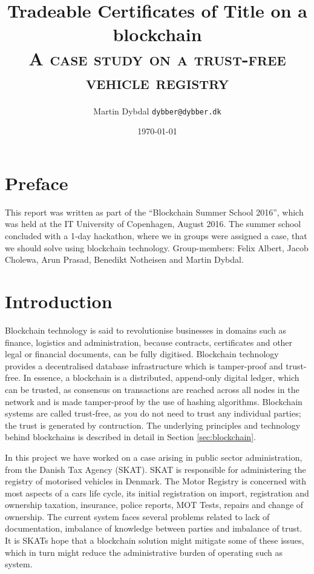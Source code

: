 \documentclass[oneside,a4paper,10pts,article]{memoir}
\title{Tradeable Certificates of Title on a blockchain \\
 {\normalfont\normalsize\scshape A case study on a trust-free vehicle registry}
}
\author{Martin Dybdal \texttt{dybber@dybber.dk}}
\date{\today}
\begin{document}
\maketitle

\begin{abstract}
  
\end{abstract}

\chapter{Preface}
This report was written as part of the ``Blockchain Summer School
2016'', which was held at the IT University of Copenhagen, August
2016. The summer school concluded with a 1-day hackathon, where we in
groups were assigned a case, that we should solve using blockchain
technology. Group-members: Felix Albert, Jacob Cholewa, Arun Prasad,
Benedikt Notheisen and Martin Dybdal.

\chapter{Introduction}
Blockchain technology is said to revolutionise businesses in domains
such as finance, logistics and administration, because contracts,
certificates and other legal or financial documents, can be fully
digitised. Blockchain technology provides a decentralised database
infrastructure which is tamper-proof and trust-free. In essence, a
blockchain is a distributed, append-only digital ledger, which can be
trusted, as consensus on transactions are reached across all nodes in
the network and is made tamper-proof by the use of hashing
algorithms. Blockchain systems are called trust-free, as you do not
need to trust any individual parties; the trust is generated by
contruction. The underlying principles and technology behind
blockchains is described in detail in Section \ref{sec:blockchain}.

In this project we have worked on a case arising in public sector
administration, from the Danish Tax Agency (SKAT). SKAT is responsible
for administering the registry of motorised vehicles in Denmark. The
Motor Registry is concerned with most aspects of a cars life cycle,
its initial registration on import, registration and ownership
taxation, insurance, police reports, MOT Tests, repairs and change of
ownership. The current system faces several problems related to lack
of documentation, imbalance of knowledge between parties and imbalance
of trust. It is SKATs hope that a blockchain solution might mitigate
some of these issues, which in turn might reduce the administrative
burden of operating such as system.
\end{document}
